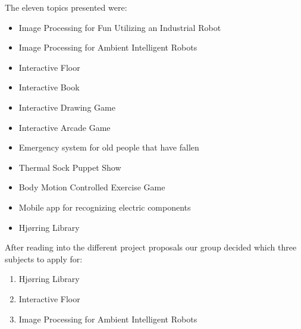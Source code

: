 

The eleven topics presented were:

\begin{itemize}
\item Image Processing for Fun Utilizing an Industrial Robot
\item Image Processing for Ambient Intelligent Robots
\item Interactive Floor
\item Interactive Book
\item Interactive Drawing Game
\item Interactive Arcade Game
\item Emergency system for old people that have fallen
\item Thermal Sock Puppet Show
\item Body Motion Controlled Exercise Game
\item Mobile app for recognizing electric components
\item Hj{\o}rring Library
\end{itemize}

After reading into the different project proposals our group decided which three subjects to apply for:

\begin{enumerate} 
\item Hj{\o}rring Library 
\item Interactive Floor 
\item Image Processing for Ambient Intelligent Robots 
\end{enumerate}

